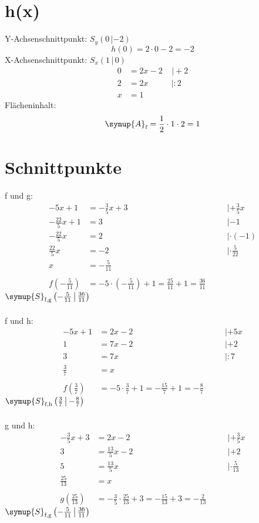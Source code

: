 \section*{h(x)}
Y-Achsenschnittpunkt: $S_y (0\,|-2)$
\begin{equation}
      h(0)=2\cdot 0-2=-2
\end{equation}
X-Achsenschnittpunkt: $S_x (1\,|\,0)$
\begin{align}
      0&=2x-2\;\;\;\;|\!+\!2\\
      2&=2x\;\;\;\;\;\;\;\;\;\;|\!:\!2\\
      x&=1
\end{align}
Flächeninhalt:
\begin{equation}
      \symup{A}_\text{f} = \frac{1}{2}\cdot1\cdot2=1 
\end{equation}

\section*{Schnittpunkte}
f und g:
\begin{align}
    -5x+1&=-\frac{3}{5}x+3 &\quad& |+\frac{3}{5}x \\
      -\frac{22}{5}x+1&=3 && |-1 \\
      -\frac{22}{5}x&=2 && | \cdot\!(-1)\\
      \frac{22}{5}x&=-2 && | \cdot\!\frac{5}{22}\\
      x&=-\frac{5}{11} \\\\
      f\left(-\frac{5}{11}\right)&=-5\cdot\left(-\frac{5}{11}\right)+1=\frac{25}{11}+1=\frac{36}{11}
\end{align}
$\symup{S}_\text{f,g}\left(-\frac{5}{11}\,\middle|\,\frac{36}{11}\right)$\\\\
f und h:
\begin{align}
    -5x+1&=2x-2 &\quad& | +5x\\
      1&=7x-2 && | +2\\
      3&=7x && | :7\\
      \frac{3}{7}&=x\\\\
      f\left(\frac{3}{7}\right)&=-5\cdot\frac{3}{7}+1=-\frac{15}{7}+1=-\frac{8}{7}
\end{align}
$\symup{S}_\text{f,h}\left(\frac{3}{7}\,\middle|\,-\frac{8}{7}\right)$\\\\
g und h:
\begin{align}
    -\frac{3}{5}x+3&=2x-2&\quad& | +\frac{3}{5}x\\
      3&=\frac{13}{5}x-2 && | +2\\
      5&=\frac{13}{5}x && | \cdot\!\frac{5}{13}\\
      \frac{25}{13}&=x \\\\
      g\left(\frac{25}{13}\right)&=-\frac{3}{5}\cdot\frac{25}{13}+3=-\frac{15}{13}+3=-\frac{2}{13}
\end{align}
$\symup{S}_\text{f,g}\left(-\frac{5}{11}\,\middle|\,\frac{36}{11}\right)$


